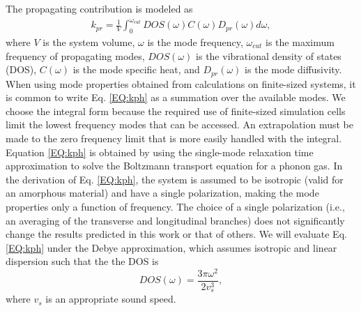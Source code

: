 \documentclass[aps,prb,onecolumn,preprint,superscriptaddress,footinbib,amsmath,amssymb,floatfix]{revtex4}
\begin{document}
The propagating contribution is modeled as
\cite{feldman_thermal_1993,feldman_numerical_1999} 
\begin{equation}\label{EQ:kph}
\begin{split}
k_{pr} = \frac{1}{V}\int_{0}^{\omega_{cut}} 
DOS(\omega) C(\omega) D_{pr}(\omega)d\omega,
\end{split}
\end{equation}
where $V$ is the system volume, $\omega$ is the mode 
frequency, $\omega_{cut}$ is the maximum frequency of propagating 
modes,  
$DOS(\omega)$ is the vibrational 
density of states (DOS), $C(\omega)$ is the mode specific heat, 
and $D_{pr}(\omega)$ is the mode diffusivity. When using mode 
properties obtained from calculations on finite-sized systems, 
it is common 
to write Eq. \eqref{EQ:kph} as a summation over the available modes.
\cite{feldman_thermal_1993,feldman_numerical_1999}
We choose the integral form because the required use of finite-sized 
simulation cells limit the lowest frequency 
modes that can be accessed. An extrapolation 
must be made to the zero frequency limit that is more easily 
handled with the integral.
\cite{love_estimate_1990,feldman_thermal_1993,cahill_thermal_1994,
feldman_numerical_1999,baldi_thermal_2008,
liu_high_2009,yang_anomalously_2010}    
Equation \eqref{EQ:kph} is obtained by using the single-mode relaxation
time approximation to solve 
the Boltzmann transport equation for a phonon gas.
\cite{ziman_electrons_2001} In the derivation of Eq. 
\eqref{EQ:kph}, the system is assumed to be isotropic 
(valid for an amorphous material) 
and have a single polarization, 
making the mode properties only a function of frequency. The 
choice of a single polarization (i.e., an averaging 
of the transverse and longitudinal branches) 
does not significantly change the results predicted in this work  
or that of others.
\cite{feldman_thermal_1993,cahill_thermal_1994,
feldman_numerical_1999,baldi_thermal_2008,liu_high_2009,
yang_anomalously_2010} 
We will evaluate Eq. \eqref{EQ:kph} under the Debye approximation, 
which assumes isotropic and linear dispersion such that the 
the DOS is
\begin{equation}\label{EQ:DOS_debye}
DOS(\omega) = \frac{3\pi\omega^2}{2v_{s}^3},
\end{equation}
where $v_s$ is an appropriate sound speed.\cite{ashcroft_solid_1976} 
\end{document}
